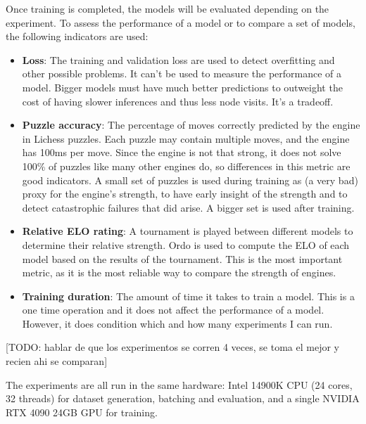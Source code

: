 Once training is completed, the models will be evaluated depending on the experiment. To assess the performance of a model or to compare a set of models, the following indicators are used:

\begin{itemize}
\item \textbf{Loss}: The training and validation loss are used to detect overfitting and other possible problems. It can't be used to measure the performance of a model. Bigger models must have much better predictions to outweight the cost of having slower inferences and thus less node visits. It's a tradeoff.

\item \textbf{Puzzle accuracy}: The percentage of moves correctly predicted by the engine in Lichess puzzles. Each puzzle may contain multiple moves, and the engine has 100ms per move. Since the engine is not that strong, it does not solve 100\% of puzzles like many other engines do, so differences in this metric are good indicators. A small set of puzzles is used during training as (a very bad) proxy for the engine's strength, to have early insight of the strength and to detect catastrophic failures that did arise. A bigger set is used after training.

\item \textbf{Relative ELO rating}: A tournament is played between different models to determine their relative strength. Ordo is used to compute the ELO of each model based on the results of the tournament. This is the most important metric, as it is the most reliable way to compare the strength of engines.


\item \textbf{Training duration}: The amount of time it takes to train a model. This is a one time operation and it does not affect the performance of a model. However, it does condition which and how many experiments I can run.
\end{itemize}

[TODO: hablar de que los experimentos se corren 4 veces, se toma el mejor y recien ahi se comparan]

The experiments are all run in the same hardware: Intel 14900K CPU (24 cores, 32 threads) for dataset generation, batching and evaluation, and a single NVIDIA RTX 4090 24GB GPU for training.






